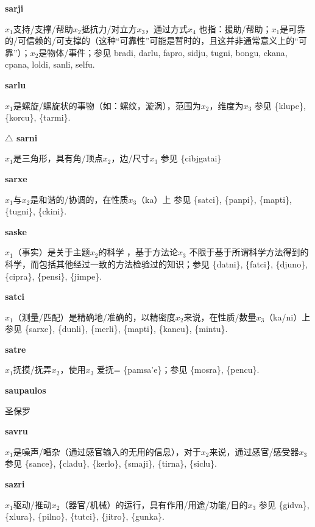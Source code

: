 \documentclass[notitlepage,twocolumn,a4paper,10pt]{book}
\begin{document}
{\sffamily\bfseries sarji}\enspace {\ttfamily\bfseries[    sra]}  $x_1$支持\slash{}支撑\slash{}帮助$x_2$抵抗力\slash{}对立方$x_3$，通过方式$x_4$ \textemdash{} 也指：援助\slash{}帮助；$x_1$是可靠的\slash{}可信赖的\slash{}可支撑的（这种“可靠性”可能是暂时的，且这并非通常意义上的“可靠”）；$x_2$是物体\slash{}事件；参见 {bradi}, {darlu}, {fapro}, {sidju}, {tugni}, {bongu}, {ckana}, {cpana}, {loldi}, {sanli}, {selfu}.

{\sffamily\bfseries sarlu} $x_1$是螺旋\slash{}螺旋状的事物（如：螺纹，漩涡），范围为$x_2$，维度为$x_3$ \textemdash{} 参见 \{klupe\}, \{korcu\}, \{tarmi\}.

{\sffamily\bfseries $\triangle$ sarni} $x_1$是三角形，具有角\slash{}顶点$x_2$，边\slash{}尺寸$x_3$ \textemdash{} 参见 \{cibjgatai\}

{\sffamily\bfseries sarxe}\enspace {\ttfamily\bfseries[sax]}  $x_1$与$x_2$是和谐的\slash{}协调的，在性质$x_3$（ka）上 \textemdash{} 参见 \{satci\}, \{panpi\}, \{mapti\}, \{tugni\}, \{ckini\}.

{\sffamily\bfseries saske}\enspace {\ttfamily\bfseries[    ske]}  $x_1$（事实）是关于主题$x_2$的科学 ，基于方法论$x_3$ \textemdash{} 不限于基于所谓科学方法得到的科学，而包括其他经过一致的方法检验过的知识；参见 \{datni\}, \{fatci\}, \{djuno\}, \{cipra\}, \{pensi\}, \{jimpe\}.

{\sffamily\bfseries satci} $x_1$（测量\slash{}匹配）是精确地\slash{}准确的，以精密度$x_2$来说，在性质\slash{}数量$x_3$（ka\slash{}ni）上 \textemdash{} 参见 \{sarxe\}, \{dunli\}, \{merli\}, \{mapti\}, \{kancu\}, \{mintu\}.

{\sffamily\bfseries satre}\enspace {\ttfamily\bfseries[        sa'e]}  $x_1$抚摸\slash{}抚弄$x_2$，使用$x_3$ \textemdash{} 爱抚= \{pamsa'e\}；参见 \{mosra\}, \{pencu\}.

{\sffamily\bfseries saupaulos} 圣保罗

{\sffamily\bfseries savru}  $x_1$是噪声\slash{}嘈杂（通过感官输入的无用的信息），对于$x_2$来说，通过感官\slash{}感受器$x_3$ \textemdash{} 参见 \{sance\}, \{cladu\}, \{kerlo\}, \{smaji\}, \{tirna\}, \{siclu\}.

{\sffamily\bfseries sazri}\enspace {\ttfamily\bfseries[saz]}  $x_1$驱动\slash{}推动$x_2$（器官\slash{}机械）的运行，具有作用\slash{}用途\slash{}功能\slash{}目的$x_3$ \textemdash{} 参见 \{gidva\}, \{xlura\}, \{pilno\}, \{tutci\}, \{jitro\}, \{gunka\}.
\end{document}

